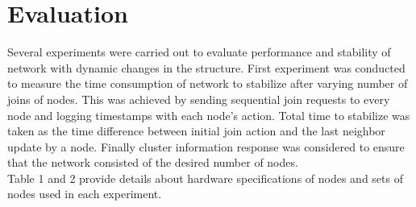 \documentclass[
    a4paper,
    twocolumn,
]{article}
\begin{document}
\section{Evaluation}

Several experiments were carried out to evaluate performance and stability of network with dynamic changes in the structure. First experiment was conducted to measure the time consumption of network to stabilize after varying number of joins of nodes. This was achieved by sending sequential join requests to every node and logging timestamps with each node's action. Total time to stabilize was taken as the time difference between initial join action and the last neighbor update by a node. Finally cluster information response was considered to ensure that the network consisted of the desired number of nodes.\\


Table 1 and 2 provide details about hardware specifications of nodes and sets of nodes used in each experiment.

\begin{table}[!ht]
\renewcommand{\arraystretch}{1.4}
\centering
{}
\caption{Hardware specification of nodes}
\end{table}
\end{document}
